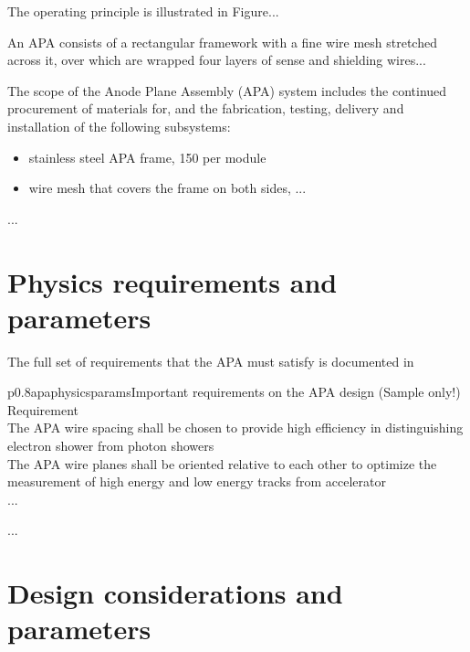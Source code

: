 The operating principle is illustrated in Figure...

An APA consists of a rectangular framework with a fine wire mesh stretched across it, over which are wrapped four layers of sense and shielding wires...

The scope of the Anode Plane Assembly (APA) system includes the continued procurement of materials for, and the fabrication, testing, delivery and installation of the following subsystems: 

\begin{itemize}
\item stainless steel APA frame, 150 per module 
\item wire mesh that covers the frame on both sides, ...
\end{itemize}
...
\section{Physics requirements and parameters}
\label{apa:req-param}

The full set of requirements that the APA must satisfy is documented in 

\begin{dunetable}{p{0.8\textwidth}}{apaphysicsparams}{Important requirements on the APA design (Sample only!)}   
Requirement  \\ \toprowrule
 The APA wire spacing shall be chosen to provide high efficiency in distinguishing electron shower from photon showers \\ \colhline
 The APA wire planes shall be oriented relative to each other to optimize the measurement of high energy and low energy tracks from accelerator  \\ \colhline
 ...\\ 
\end{dunetable}
...


\section{Design considerations and parameters}
\label{apa:design-consid}

